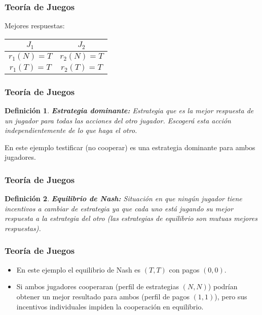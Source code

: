 \documentclass[dvipsnames,table,leqno]{beamer}
\newtheorem{mydef}{Definición}
\newcommand{\peq}[1]{{\scriptscriptstyle{#1}}}
\newcommand{\rp}[1]{\left(#1\right)}
\begin{document}
		\begin{frame}
			\frametitle{Teoría de Juegos}
			Mejores respuestas:
			\begin{table}[htbp!]
				\centering
					\begin{tabular}{|c|c|}\hline
						$J_\peq{1}$				 &$J_\peq{2}$\\ [1ex] \hline
						$r_\peq{1}\rp{N}=T$&$r_\peq{2}\rp{N}=T$ \\ [1ex] 
						$r_\peq{1}\rp{T}=T$&$r_\peq{2}\rp{T}=T$ \\ [1ex] \hline 
					\end{tabular}%
			\end{table}
		\end{frame}	

		\begin{frame}
			\frametitle{Teoría de Juegos}
			\begin{mydef}
				\textbf{Estrategia dominante:} Estrategia que es la mejor respuesta de un jugador para todas las acciones del otro jugador. Escogerá esta acción independientemente de lo que haga el otro.
			\end{mydef}
			En este ejemplo testificar (no cooperar) es una estrategia dominante para ambos jugadores.
		\end{frame}	

		\begin{frame}
			\frametitle{Teoría de Juegos}
			\begin{mydef}
				\textbf{Equilibrio de Nash:} Situación en que ningún jugador tiene incentivos a cambiar de estrategia ya que cada uno está jugando su mejor respuesta a la estrategia del otro (las estrategias de equilibrio son mutuas mejores respuestas).
			\end{mydef}
		\end{frame}	

		\begin{frame}
			\frametitle{Teoría de Juegos}
			\begin{itemize}
				\item En este ejemplo el equilibrio de Nash es $\rp{T,T}$ con pagos $\rp{0,0}$.
				\item Si ambos jugadores cooperaran (perfil de estrategias $\rp{N,N}$) podrían obtener un mejor resultado para ambos (perfil de pagos $\rp{1,1}$), pero sus incentivos individuales impiden la cooperación en equilibrio.
			\end{itemize}
		\end{frame}	
		
\end{document}
